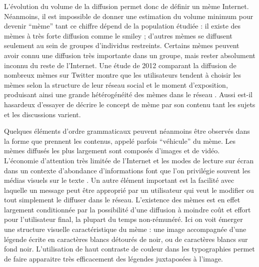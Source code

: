 L{\textquoteright}évolution du volume de la diffusion permet donc de définir un mème Internet. Néanmoins, il est impossible de donner une estimation du volume minimum pour devenir {\textquotedblleft}mème{\textquotedblright} tant ce chiffre dépend de la population étudiée : il existe des mèmes à très forte diffusion comme le smiley ; d{\textquoteright}autres mèmes se diffusent seulement au sein de groupes d{\textquoteright}individus restreints. Certains mèmes peuvent avoir connu une diffusion très importante dans un groupe, mais rester absolument inconnu du reste de l{\textquoteright}Internet. Une étude de 2012 comparant la diffusion de nombreux mèmes sur Twitter montre que les utilisateurs tendent à choisir les mèmes selon la structure de leur réseau social et le moment d{\textquoteright}exposition, produisant ainsi une grande hétérogénéité des mèmes dans le réseau \citep{Weng2012}. Aussi est-il hasardeux d{\textquoteright}essayer de décrire le concept de mème par son contenu tant les sujets et les discussions varient. 

Quelques éléments d{\textquoteright}ordre grammaticaux peuvent néanmoins être observés dans la forme que prennent les contenus, appelé parfois {\textquotedblleft}véhicule{\textquotedblright} du mème. Les mèmes diffusés les plus largement sont composés d{\textquoteright}images et de vidéo. L{\textquoteright}économie d{\textquoteright}attention très limitée de l{\textquoteright}Internet et les modes de lecture sur écran dans un contexte d{\textquoteright}abondance d{\textquoteright}informations font que l{\textquoteright}on privilégie souvent les médias visuels sur le texte \citep{Goldhaber2006}. Un autre élément important est la facilité avec laquelle un message peut être approprié par un utilisateur qui veut le modifier ou tout simplement le diffuser dans le réseau. L{\textquoteright}existence des mèmes est en effet largement conditionnée par la possibilité d{\textquoteright}une diffusion à moindre co\^ut et effort pour l{\textquoteright}utilisateur final, la plupart du temps non-rémunéré. Ici on voit émerger une structure visuelle caractéristique du mème : une image accompagnée d{\textquoteright}une légende écrite en caractères blancs détourés de noir, ou de caractères blancs sur fond noir. L{\textquoteright}utilisation de haut contraste de couleur dans les typographies permet de faire apparaitre très efficacement des légendes juxtaposées à l{\textquoteright}image.

